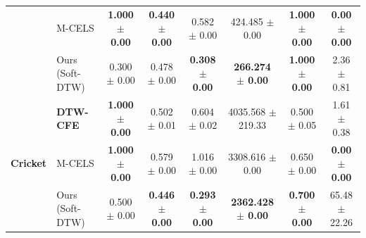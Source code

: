 \documentclass[11pt,a4paper]{report}
\begin{document}
\begin{table}[h!]
\begin{tabular}{llcccccc}
        & M-CELS & \textbf{1.000 $\pm$ 0.00} & \textbf{0.440 $\pm$ 0.00} & 0.582 $\pm$ 0.00 & 424.485 $\pm$ 0.00 & \textbf{1.000 $\pm$ 0.00} & \textbf{0.00 $\pm$ 0.00} \\
        & Ours (Soft-DTW) & 0.300 $\pm$ 0.00 & 0.478 $\pm$ 0.00 & \textbf{0.308 $\pm$ 0.00} & \textbf{266.274 $\pm$ 0.00} & \textbf{1.000 $\pm$ 0.00} & 2.36 $\pm$ 0.81 \\
        \midrule
        \multirow{3}{*}{\textbf{Cricket}} 
        & \textbf{DTW-CFE} & \textbf{1.000 $\pm$ 0.00} & 0.502 $\pm$ 0.01 & 0.604 $\pm$ 0.02 & 4035.568 $\pm$ 219.33 & 0.500 $\pm$ 0.05 & 1.61 $\pm$ 0.38 \\
        & M-CELS & \textbf{1.000 $\pm$ 0.00} & 0.579 $\pm$ 0.00 & 1.016 $\pm$ 0.00 & 3308.616 $\pm$ 0.00 & 0.650 $\pm$ 0.00 & \textbf{0.00 $\pm$ 0.00} \\
        & Ours (Soft-DTW) & 0.500 $\pm$ 0.00 & \textbf{0.446 $\pm$ 0.00} & \textbf{0.293 $\pm$ 0.00} & \textbf{2362.428 $\pm$ 0.00} & \textbf{0.700 $\pm$ 0.00} & 65.48 $\pm$ 22.26 \\
        \bottomrule
    \end{tabular}
\end{table}
\end{document}
